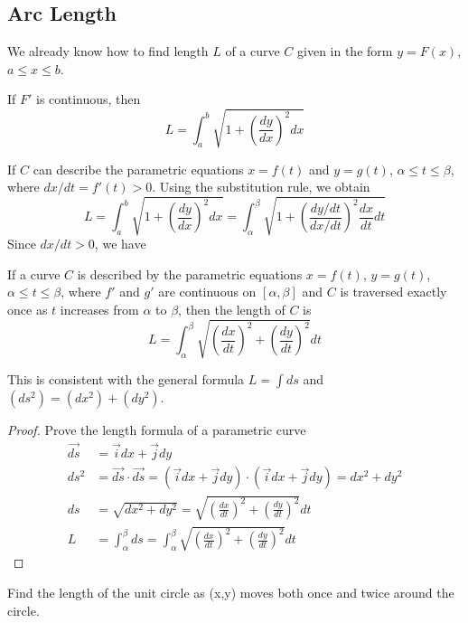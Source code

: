   \subsection*{Arc Length}
    We already know how to find length $L$ of a curve $C$ given in the form ${y=F(x)}$, $a \leq x \leq b$.
    \begin{definition}
      If $F'$ is continuous, then $$L=\int_{a}^{b}\sqrt{1+\left(\frac{dy}{dx}\right)^2 dx}$$
    \end{definition}
    If $C$ can describe the parametric equations $x=f(t)$ and $y=g(t)$, $\alpha \leq t \leq \beta$, where $dx/dt = f'(t)>0$. Using the substitution rule, we obtain
      $$L=\int_{a}^{b}\sqrt{1+\left(\frac{dy}{dx}\right)^2 dx} = \int_{\alpha}^{\beta}\sqrt{1+\left(\frac{dy/dt}{dx/dt}\right)^2 \frac{dx}{dt} dt}$$
    Since $dx/dt > 0$, we have
    \begin{theorem}
      If a curve $C$ is described by the parametric equations $x=f(t)$, $y=g(t)$, $\alpha \leq t \leq \beta$, where $f'$ and $g'$ are continuous on $[\alpha,\beta]$ and $C$ is traversed exactly once as $t$ increases from $\alpha$ to $\beta$, then the length of $C$ is
        $$L = \int_{\alpha}^{\beta}\sqrt{\left(\frac{dx}{dt}\right)^2+\left(\frac{dy}{dt}\right)^2} dt$$
    \end{theorem}
    This is consistent with the general formula $L=\int ds$ and ${(ds^2)=(dx^2)+(dy^2)}$.
    \begin{proof}\let\qed\relax
      Prove the length formula of a parametric curve
      \begin{align*}
        \overrightarrow{ds} &= \overrightarrow{i}dx + \overrightarrow{j}dy\\
        ds^2 &= \overrightarrow{ds} \cdot \overrightarrow{ds} = \left(\overrightarrow{i}dx+\overrightarrow{j}dy\right) \cdot \left(\overrightarrow{i}dx+\overrightarrow{j}dy\right) = dx^2 + dy^2 \\
        ds &= \sqrt{dx^2 + dy^2} = \sqrt{\left(\frac{dx}{dt}\right)^2+\left(\frac{dy}{dt}\right)^2} dt \\
        L &= \int_{\alpha}^{\beta} ds = \int_{\alpha}^{\beta}\sqrt{\left(\frac{dx}{dt}\right)^2+\left(\frac{dy}{dt}\right)^2} dt
      \end{align*}
    \end{proof}
    \begin{example}
      Find the length of the unit circle as (x,y) moves both once and twice around the circle.
    \end{example}
